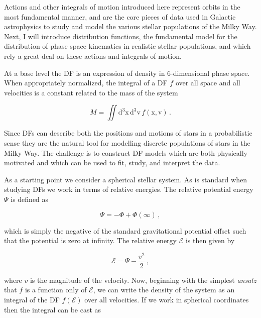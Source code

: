 Actions and other integrals of motion introduced here represent orbits in the most fundamental manner, and are the core pieces of data used in Galactic astrophysics to study and model the various stellar populations of the Milky Way. Next, I will introduce distribution functions, the fundamental model for the distribution of phase space kinematics in realistic stellar populations, and which rely a great deal on these actions and integrals of motion.


At a base level the DF is an expression of density in 6-dimensional phase space. When appropriately normalized, the integral of a DF $f$ over all space and all velocities is a constant related to the mass of the system

\begin{equation}
    \label{ch1:eq:df-normalization}
    M = \iint \mathrm{d}^3\mathbf{\mathrm{x}}\, \mathrm{d}^3\mathbf{\mathrm{v}}\, f( \mathbf{\mathrm{x}}, \mathbf{\mathrm{v}}) \,.
\end{equation}

\noindent Since DFs can describe both the positions and motions of stars in a probabilistic sense they are the natural tool for modelling discrete populations of stars in the Milky Way. The challenge is to construct DF models which are both physically motivated and which can be used to fit, study, and interpret the data.

As a starting point we consider a spherical stellar system. As is standard when studying DFs we work in terms of relative energies. The relative potential energy $\Psi$ is defined as 

\begin{equation}
    \label{ch1:eq:relative-potential-energy}
    \Psi = -\Phi + \Phi(\infty)\,,
\end{equation}

\noindent which is simply the negative of the standard gravitational potential offset such that the potential is zero at infinity. The relative energy $\mathcal{E}$ is then given by

\begin{equation}
    \label{ch1:eq:relative-energy}
    \mathcal{E} = \Psi - \frac{v^{2}}{2}\,,
\end{equation}

\noindent where $v$ is the magnitude of the velocity. Now, beginning with the simplest \textit{ansatz} that $f$ is a function only of $\mathcal{E}$, we can write the density of the system as an integral of the DF $f(\mathcal{E})$ over all velocities. If we work in spherical coordinates then the integral can be cast as 

